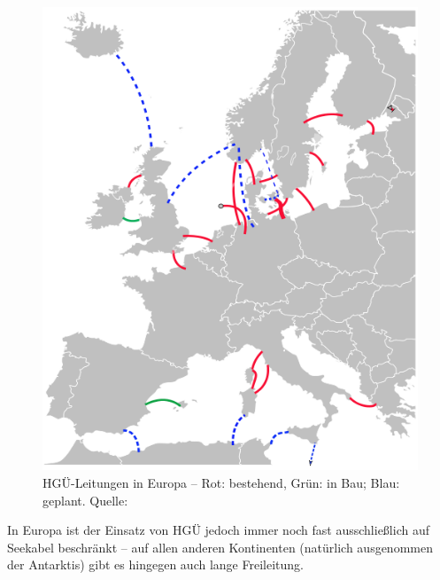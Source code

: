 \begin{figure}[htbn]
\begin{center}
\noindent
\includegraphics[scale=0.5]{HVDC_Europe.png}
\end{center}
\caption{HGÜ-Leitungen in Europa -- Rot: bestehend, Grün: in Bau; Blau: geplant. Quelle: \cite{Europa}}
\label{pic:Europa}
\end{figure}

In Europa ist der Einsatz von HGÜ jedoch immer noch fast ausschließlich auf Seekabel beschränkt -- auf allen anderen Kontinenten (natürlich ausgenommen der Antarktis) gibt es hingegen auch lange Freileitung.


